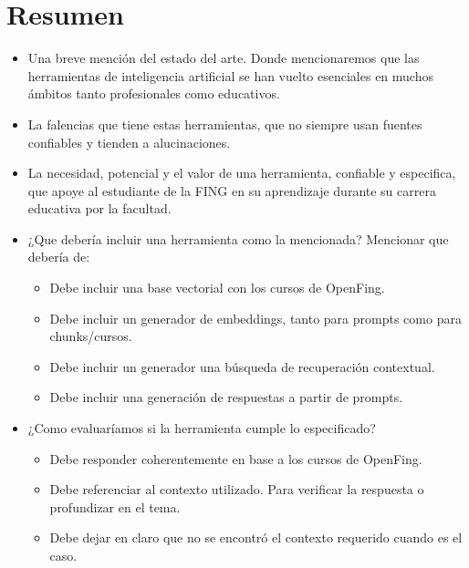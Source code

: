 \documentclass{../../prgrado}
\begin{document}
\chapter*{Resumen}
\begin{itemize}
    \item Una breve mención del estado del arte. Donde mencionaremos que las herramientas de inteligencia artificial se han vuelto esenciales en muchos ámbitos tanto profesionales como educativos.
    \item La falencias que tiene estas herramientas, que no siempre usan fuentes confiables y tienden a alucinaciones. 
    \item La necesidad, potencial y el valor de una herramienta, confiable y especifica, que apoye al estudiante de la FING en su aprendizaje durante su carrera educativa por la facultad.
    \item ¿Que debería incluir una herramienta como la mencionada?
    Mencionar que debería de:
    \begin{itemize}
        \item Debe incluir una base vectorial con los cursos de \Gls{OpenFing}.
        \item Debe incluir un generador de embeddings, tanto para prompts como para chunks/cursos.
        \item Debe incluir un generador una búsqueda de recuperación contextual.
        \item Debe incluir una generación de respuestas a partir de prompts.
    \end{itemize}

    \item ¿Como evaluaríamos si la herramienta cumple lo especificado?
    \begin{itemize}
        \item Debe responder coherentemente en base a los cursos de \gls{OpenFing}.
        \item Debe referenciar al contexto  utilizado. Para verificar la respuesta o profundizar en el tema. 
        \item Debe dejar en claro que no se encontró el contexto requerido cuando es el caso.
    \end{itemize}
\end{itemize}


\hfill \break
{}

\end{document}
